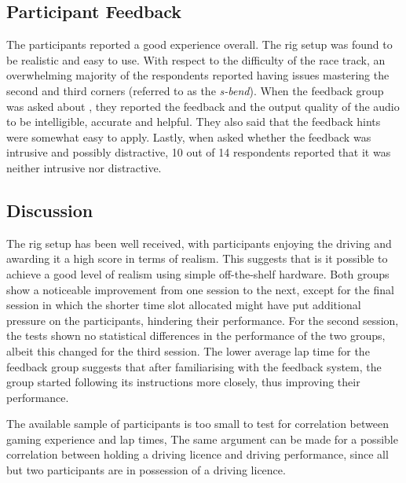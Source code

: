 \documentclass{sig-alternate}
\begin{document}
{\subsection{Participant Feedback}
The participants reported a good experience overall. The rig setup was found to be realistic and easy to use. With respect to the difficulty of the race track, an overwhelming majority of the respondents reported having issues mastering the second and third corners (referred to as the \emph{s-bend}). When the feedback group was asked about \methodname, they reported the feedback and the output quality of the audio to be intelligible, accurate and helpful. They also said that the feedback hints were somewhat easy to apply. Lastly, when asked whether the feedback was intrusive and possibly distractive, 10 out of 14 respondents reported that it was neither intrusive nor distractive.

\subsection{Discussion}
The rig setup has been well received, with participants enjoying the driving and awarding it a high score in terms of realism. This suggests that is it possible to achieve a good level of realism using simple off-the-shelf hardware. 
Both groups show a noticeable improvement from one session to the next, except for the final session in which the shorter time slot allocated might have put additional pressure on the participants, hindering their performance.
For the second session, the tests shown no statistical differences in the performance of the two groups, albeit this changed for the third session. The lower average lap time for the feedback group suggests that after familiarising with the feedback system, the group started following its instructions more closely, thus improving their performance.

The available sample of participants is too small to test for correlation between gaming experience and lap times, The same argument can be made for a possible correlation between holding a driving licence and driving performance, since all but two participants are in possession of a driving licence.
}
\end{document}
